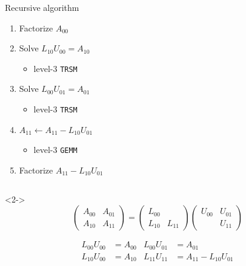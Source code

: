 \documentclass[xcolor={rgb,x11names,svgnames},rgb,x11names,svgnames]{beamer}
\begin{document}
\begin{frame}[label=lu]
\begin{columns}
\begin{column}{5.5cm}
 \begin{block}{Recursive algorithm}
   \begin{enumerate}
   \item<3-> Factorize $A_{00}$
   \item<5-> Solve $L_{10} U_{00} = A_{10}$
     \begin{itemize}
     \item level-3 \texttt{TRSM}
     \end{itemize}

   \item<5-> Solve $L_{00} U_{01} = A_{01}$
     \begin{itemize}
     \item level-3 \texttt{TRSM}
     \end{itemize}
     
   \item<7-> $A_{11} \gets A_{11} - L_{10} U_{01}$
     \begin{itemize}
     \item level-3 \texttt{GEMM}
     \end{itemize}
     
   \item<9-> Factorize $A_{11} - L_{10} U_{01}$     
   \end{enumerate}
 \end{block}

\end{column}
\end{columns}

\medskip

\begin{visibleenv}<2->
\[
  \begin{pmatrix}
       A_{00} & A_{01} \\
       A_{10} & A_{11} 
     \end{pmatrix}
     =
     \begin{pmatrix}
       L_{00} &  \\
       L_{10} & L_{11} 
     \end{pmatrix}
     \begin{pmatrix}
       U_{00} & U_{01} \\
       & U_{11} 
     \end{pmatrix}
   \]

   
   \begin{align*}     
     L_{00} U_{00} &= A_{00} & L_{00} U_{01} &= A_{01} \\
     L_{10} U_{00} &= A_{10} & L_{11} U_{11} &= A_{11} - L_{10} U_{01}\\
   \end{align*}
 \end{visibleenv}
\end{frame}
\end{document}
